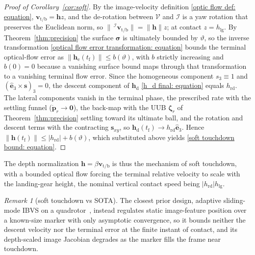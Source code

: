 \documentclass{IEEEtaes}
\theoremstyle{definition}
\theoremstyle{remark}
\newtheorem{remark}{Remark}
\begin{document}
\begin{proof}[Proof of Corollary~\ref{cor:soft}] By the image-velocity definition \eqref{optic flow def: equation}, $\boldsymbol{v}_{\text{t/b}}=\boldsymbol{h}z$, and the de-rotation between $\mathcal{V}$ and $\mathcal{I}$ is a yaw rotation that preserves the Euclidean norm, so $\|\,^\mathcal{I}\boldsymbol{v}_{\text{t/b}}\|=\|\boldsymbol{h}\|z$; at contact $z=h_\text{lg}$. By Theorem~\ref{thm:precision} the surface $\boldsymbol{\sigma}$ is ultimately bounded by $\vartheta$, so the inverse transformation \eqref{optical flow error transformation: equation} bounds the terminal optical-flow error as $\|\boldsymbol{h}_\text{e}(t_\text{f})\|\le b(\vartheta)$, with $b$ strictly increasing and $b(0)=0$ because a vanishing surface bound maps through that transformation to a vanishing terminal flow error. Since the homogeneous component $s_3\equiv 1$ and $(\hat{\boldsymbol{e}}_3\times\boldsymbol{s})_3=0$, the descent component of $\boldsymbol{h}_\text{d}$ \eqref{h_d final: equation} equals $h_\text{rd}$. The lateral components vanish in the terminal phase, the prescribed rate with the settling funnel ($\dot{\boldsymbol{p}}_r\to\boldsymbol{0}$), the back-map with the UUB $\boldsymbol{\zeta}_r$ of Theorem~\ref{thm:precision} settling toward its ultimate ball, and the rotation and descent terms with the contracting $\boldsymbol{s}_{xy}$, so $\boldsymbol{h}_\text{d}(t_\text{f})\to h_\text{rd}\hat{\boldsymbol{e}}_3$. Hence $\|\boldsymbol{h}(t_\text{f})\|\le|h_\text{rd}|+b(\vartheta)$, which substituted above yields \eqref{soft touchdown bound: equation}. \end{proof}

The depth normalization $\boldsymbol{h}=\beta\boldsymbol{v}_{\text{t/b}}$ is thus the mechanism of soft touchdown, with a bounded optical flow forcing the terminal relative velocity to scale with the landing-gear height, the nominal vertical contact speed being $|h_\text{rd}|h_\text{lg}$.

\begin{remark}[soft touchdown vs SOTA]\label{rem:soft-sota} The closest prior design, adaptive sliding-mode IBVS on a quadrotor~\cite{lee2012}, instead regulates static image-feature position over a known-size marker with only asymptotic convergence, so it bounds neither the descent velocity nor the terminal error at the finite instant of contact, and its depth-scaled image Jacobian degrades as the marker fills the frame near touchdown.\end{remark}
\end{document}
